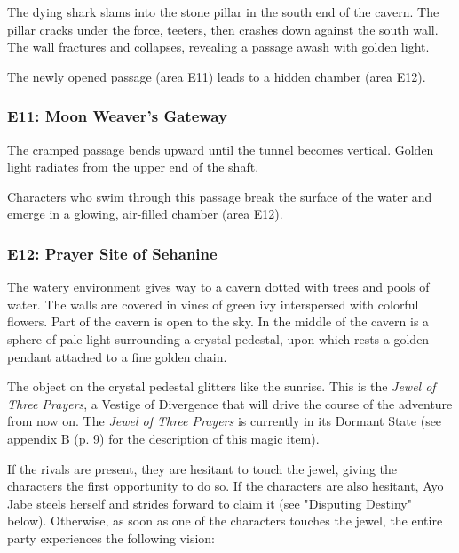 \documentclass[a4paper, 11pt, bg=full, twocolumn, nooutline]{dndbook}
\begin{document}
\begin{DndReadAloud}
The dying shark slams into the stone pillar in the south end of the cavern. The pillar cracks under the force, teeters, then crashes down against the south wall. The wall fractures and collapses, revealing a passage awash with golden light.
\end{DndReadAloud}

The newly opened passage (area E11) leads to a hidden chamber (area E12).

\subsubsection{E11: Moon Weaver's Gateway}

\begin{DndReadAloud}
The cramped passage bends upward until the tunnel becomes vertical. Golden light radiates from the upper end of the shaft.
\end{DndReadAloud}

Characters who swim through this passage break the surface of the water and emerge in a glowing, air-filled chamber (area E12).

\subsubsection{E12: Prayer Site of Sehanine}

\begin{DndReadAloud}
The watery environment gives way to a cavern dotted with trees and pools of water. The walls are covered in vines of green ivy interspersed with colorful flowers. Part of the cavern is open to the sky.
In the middle of the cavern is a sphere of pale light surrounding a crystal pedestal, upon which rests a golden pendant attached to a fine golden chain.
\end{DndReadAloud}

The object on the crystal pedestal glitters like the sunrise. This is the \textit{Jewel of Three Prayers}, a Vestige of Divergence that will drive the course of the adventure from now on. The \textit{Jewel of Three Prayers} is currently in its Dormant State (see appendix B (p. 9) for the description of this magic item).

If the rivals are present, they are hesitant to touch the jewel, giving the characters the first opportunity to do so. If the characters are also hesitant, Ayo Jabe steels herself and strides forward to claim it (see "Disputing Destiny" below). Otherwise, as soon as one of the characters touches the jewel, the entire party experiences the following vision:
\end{document}
